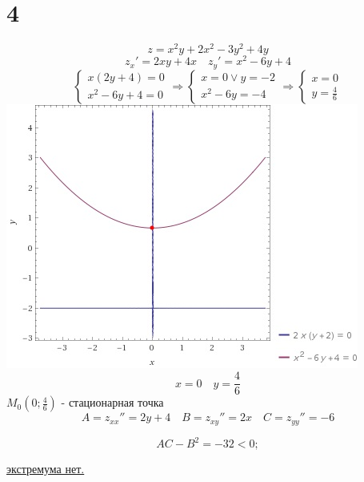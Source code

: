 \documentclass[a4paper, 12pt]{article}
\begin{document}
\section*{4}
\[
	z = x^2y + 2x^2 - 3y^2 +4 y
\]
\[
	z_x' = 2xy + 4x \quad z_y' = x^2 -6y +4
\]
\begin{equation*}
 \begin{cases}
   x(2y+4) = 0
   \\
   x^2 -6y + 4 = 0
 \end{cases}
 \Rightarrow
 \begin{cases}
 	x = 0 \lor y = -2
 	\\
 	x^2 -6y = -4
 \end{cases}
 \Rightarrow
 \begin{cases}
 	x = 0
 	\\
 	y = \frac{4}{6}
 \end{cases}
 \end{equation*}
 \includegraphics{img/1.jpg}\\
\[
	x = 0 \quad y = \frac{4}{6}
\]
$ M_0(0;\frac{4}{6}) $ - стационарная точка\\
\[
 	A = z_{xx}'' = 2y+4 \quad B = z_{xy}''= 2x \quad C = z_{yy}'' = -6
 \]

\[
	AC - B^2 = -32 < 0;
\]

\underline{экстремума нет.}
\end{document}
